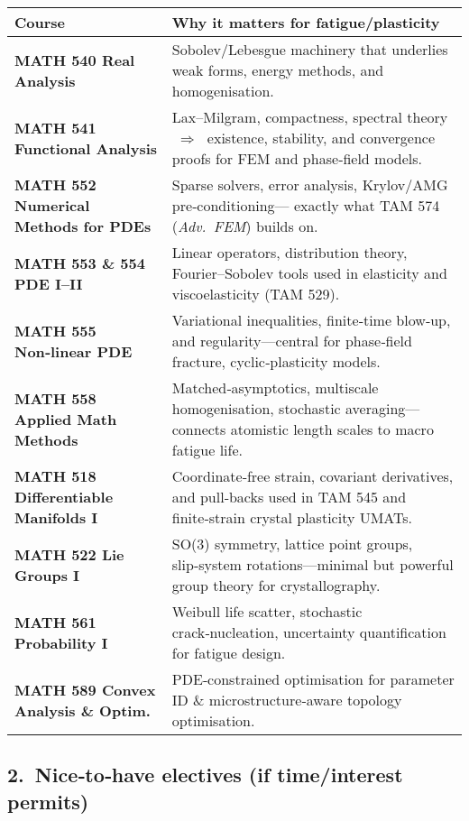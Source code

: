 \documentclass[12pt]{article}
\theoremstyle{definition} %
\theoremstyle{plain} %
\begin{document}
\begin{tabular}{@{}p{2.8cm}p{9.6cm}@{}}
\toprule
\textbf{Course} & \textbf{Why it matters for fatigue/plasticity} \\
\midrule
\textbf{MATH 540 Real Analysis} &
Sobolev/Lebesgue machinery that underlies weak forms, energy methods,
and homogenisation. \\[0.2em]
\textbf{MATH 541 Functional Analysis} &
Lax–Milgram, compactness, spectral theory $\;\Rightarrow\;$ existence,
stability, and convergence proofs for FEM and phase‑field models. \\[0.2em]
\textbf{MATH 552 Numerical Methods for PDEs} &
Sparse solvers, error analysis, Krylov/AMG pre‑conditioning—
exactly what TAM 574 (\emph{Adv.\ FEM}) builds on. \\[0.2em]
\textbf{MATH 553 \& 554 PDE I–II} &
Linear operators, distribution theory, Fourier–Sobolev tools used in
elasticity and viscoelasticity (TAM 529). \\[0.2em]
\textbf{MATH 555 Non‑linear PDE} &
Variational inequalities, finite‑time blow‑up, and regularity—central
for phase‑field fracture, cyclic‑plasticity models. \\[0.2em]
\textbf{MATH 558 Applied Math Methods} &
Matched‑asymptotics, multiscale homogenisation, stochastic averaging—
connects atomistic length scales to macro fatigue life. \\[0.2em]
\textbf{MATH 518 Differentiable Manifolds I} &
Coordinate‑free strain, covariant derivatives, and pull‑backs used in
TAM 545 and finite‑strain crystal plasticity UMATs. \\[0.2em]
\textbf{MATH 522 Lie Groups I} &
SO(3) symmetry, lattice point groups, slip‑system rotations—minimal but
powerful group theory for crystallography. \\[0.2em]
\textbf{MATH 561 Probability I} &
Weibull life scatter, stochastic crack‑nucleation, uncertainty
quantification for fatigue design. \\[0.2em]
\textbf{MATH 589 Convex Analysis \& Optim.} &
PDE‑constrained optimisation for parameter ID \& microstructure‑aware
topology optimisation. \\
\bottomrule
\end{tabular}

\subsection*{2.\  Nice‑to‑have electives (if time/interest permits)}
\end{document}
